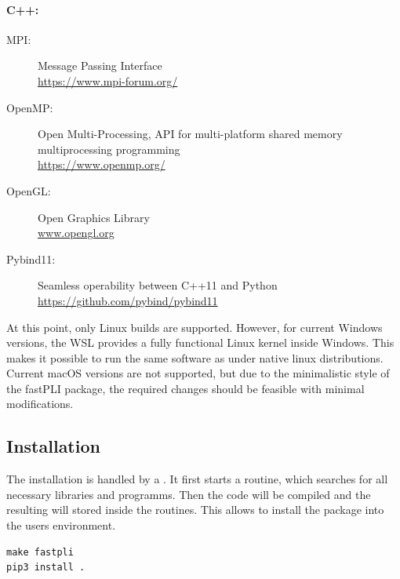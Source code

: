 \paragraph{C++:}
\begin{description}
\item[MPI:] Message Passing Interface \cite{message2015mpi}\\
\url{https://www.mpi-forum.org/}
\item[OpenMP:] Open Multi-Processing, API for multi-platform shared memory multiprocessing programming \cite{dagum1998openmp}\\
\url{https://www.openmp.org/}
\item[OpenGL:] Open Graphics Library \cite{khronos}\\
\url{www.opengl.org}
\item[Pybind11:] Seamless operability between C++11 and Python \cite{pybind11}\\ \url{https://github.com/pybind/pybind11}
\end{description}
%
%
At this point, only Linux builds are supported.
However, for current Windows versions, the \ac{WSL} provides a fully functional Linux kernel inside Windows.
This makes it possible to run the same software as under native linux distributions.
Current macOS versions are not supported, but due to the minimalistic style of the \ac{fastPLI} package, the required changes should be feasible with minimal modifications.
%
%
%
\subsection{Installation}
%
The installation is handled by a .
It first starts a  routine, which searches for all necessary libraries and programms.
Then the \cpp{} code will be compiled and the resulting  will stored inside the \python{} routines.
This allows \python{} to install the package into the users environment.
%
\begin{lstfloat}[!ht]
\lstset{style=common}
\begin{lstlisting}
make fastpli
pip3 install .
\end{lstlisting}
\end{lstfloat}
%
%
%
